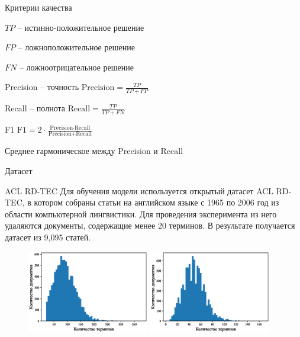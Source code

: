 \documentclass{beamer}
\begin{document}
\begin{frame}{Критерии качества}
\begin{block}

$TP$ -- истинно-положительное решение

$FP$ -- ложноположительное решение

$FN$ -- ложноотрицательное решение
\end{block}

\begin{block}{Precision -- точность}
$\text{Precision} = \frac{TP}{TP + FP}$
\end{block}

\begin{block}{Recall -- полнота}
$\text{Recall} = \frac{TP}{TP + FN}$
\end{block}

\begin{block}{F1}
$\text{F1} = 2 \cdot \frac{\text{Precision} \cdot \text{Recall}}{\text{Precision} + \text{Recall}}$

Среднее гармоническое между Precision и Recall
\end{block}
\end{frame}

\begin{frame}{Датасет}
\begin{block}{ACL RD-TEC}
\small Для обучения модели используется открытый датасет ACL RD-TEC, в котором собраны статьи на английском языке с 1965 по 2006 год из области компьютерной лингвистики. Для проведения эксперимента из него удаляются документы, содержащие менее 20 терминов. В результате получается датасет из 9,095 статей.
\end{block}

\begin{figure}
   \includegraphics[width=0.475\textwidth]{Pictures/Statistics.eps}
   \hfill
   \includegraphics[width=0.475\textwidth]{Pictures/Statistics_1.eps}
\end{figure}
\end{frame}
\end{document}
